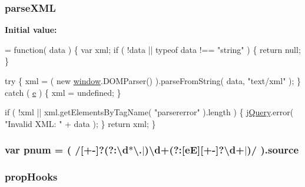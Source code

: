 \subsubsection[{\texorpdfstring{parse\+X\+ML}{parseXML}}]{ parse\+X\+ML}\hypertarget{jquery-3_82_81_8js_ab58e01f0a789f6062d3b05417f56140e}{}\label{jquery-3_82_81_8js_ab58e01f0a789f6062d3b05417f56140e}
{\bfseries Initial value\+:}
\begin{DoxyCode}
= \textcolor{keyword}{function}( data ) \{
    var xml;
    \textcolor{keywordflow}{if} ( !data || typeof data !== \textcolor{stringliteral}{"string"} ) \{
        \textcolor{keywordflow}{return} null;
    \}

    
    
    \textcolor{keywordflow}{try} \{
        xml = ( \textcolor{keyword}{new} \hyperlink{jquery-3_82_81_8js_ad55530ae1e5978df8e721017c1fc8466}{window}.DOMParser() ).parseFromString( data, \textcolor{stringliteral}{"text/xml"} );
    \} \textcolor{keywordflow}{catch} ( \hyperlink{socketio_8min_8js_ab9bf22d472db6a44821bea0ef63ba8c7}{e} ) \{
        xml = undefined;
    \}

    \textcolor{keywordflow}{if} ( !xml || xml.getElementsByTagName( \textcolor{stringliteral}{"parsererror"} ).length ) \{
        \hyperlink{jquery-3_82_81_8js_a609525712f1102566c2b03866ceb2bba}{jQuery}.error( \textcolor{stringliteral}{"Invalid XML: "} + data );
    \}
    \textcolor{keywordflow}{return} xml;
\}
\end{DoxyCode}
\subsubsection[{\texorpdfstring{pnum}{pnum}}]{\setlength{\rightskip}{0pt plus 5cm}var pnum = ( /\mbox{[}+-\/\mbox{]}?(?\+:\textbackslash{}d$\ast$\textbackslash{}.$\vert$)\textbackslash{}d+(?\+:\mbox{[}eE\mbox{]}\mbox{[}+-\/\mbox{]}?\textbackslash{}d+$\vert$)/ ).source}\hypertarget{jquery-3_82_81_8js_af607b3f0791bfa36dce62ff44ab21612}{}\label{jquery-3_82_81_8js_af607b3f0791bfa36dce62ff44ab21612}
\subsubsection[{\texorpdfstring{prop\+Hooks}{propHooks}}]{ prop\+Hooks}\hypertarget{jquery-3_82_81_8js_a5679fa4cd6152d76b96e19f7dfb8b057}{}\label{jquery-3_82_81_8js_a5679fa4cd6152d76b96e19f7dfb8b057}
